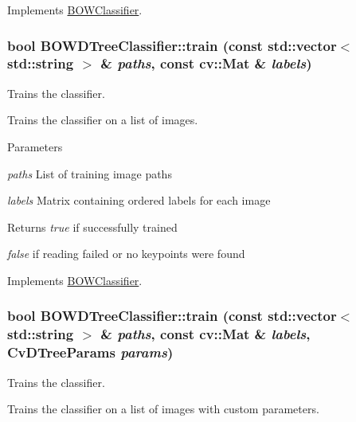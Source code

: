 Implements \hyperlink{classBOWClassifier_a63bff22f5005e1b79d9c4cd5e7a57748}{BOWClassifier}.

\hypertarget{classBOWDTreeClassifier_ade9a3a1bf1ada1a2fdeefa96eb67edd0}{
\subsubsection[{train}]{\setlength{\rightskip}{0pt plus 5cm}bool BOWDTreeClassifier::train (const std::vector$<$ std::string $>$ \& {\em paths}, \/  const cv::Mat \& {\em labels})}}
\label{classBOWDTreeClassifier_ade9a3a1bf1ada1a2fdeefa96eb67edd0}


Trains the classifier. 

Trains the classifier on a list of images.


\begin{DoxyParams}{Parameters}
\item[{\em paths}]List of training image paths \item[{\em labels}]Matrix containing ordered labels for each image \end{DoxyParams}
\begin{DoxyReturn}{Returns}
{\itshape true\/} if successfully trained\par
 {\itshape false\/} if reading failed or no keypoints were found 
\end{DoxyReturn}


Implements \hyperlink{classBOWClassifier_a8a00f5cadf166f361a411d5a4e67b4d6}{BOWClassifier}.

\hypertarget{classBOWDTreeClassifier_a9bcdcb5fa8bb35d5d4a518b7a060c127}{
\subsubsection[{train}]{\setlength{\rightskip}{0pt plus 5cm}bool BOWDTreeClassifier::train (const std::vector$<$ std::string $>$ \& {\em paths}, \/  const cv::Mat \& {\em labels}, \/  CvDTreeParams {\em params})}}
\label{classBOWDTreeClassifier_a9bcdcb5fa8bb35d5d4a518b7a060c127}


Trains the classifier. 

Trains the classifier on a list of images with custom parameters.


